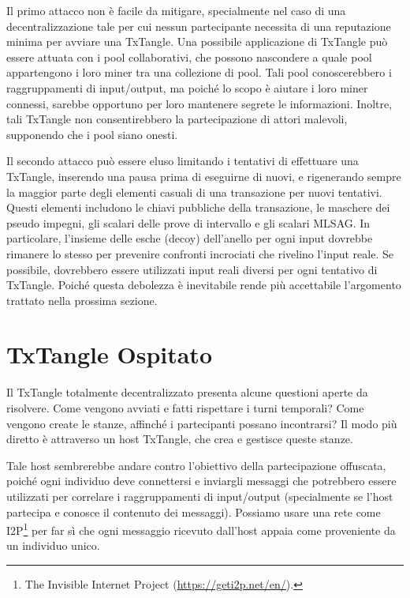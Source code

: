 Il primo attacco non è facile da mitigare, specialmente nel caso di una decentralizzazione tale per cui nessun partecipante necessita di una reputazione minima per avviare una TxTangle. Una possibile applicazione di TxTangle può essere attuata con i pool collaborativi, che possono nascondere a quale pool appartengono i loro miner tra una collezione di pool. Tali pool conoscerebbero i raggruppamenti di input/output, ma poiché lo scopo è aiutare i loro miner connessi, sarebbe opportuno per loro mantenere segrete le informazioni. Inoltre, tali TxTangle non consentirebbero la partecipazione di attori malevoli, supponendo che i pool siano onesti.

Il secondo attacco può essere eluso limitando i tentativi di effettuare una TxTangle, inserendo una pausa prima di eseguirne di nuovi, e rigenerando sempre la maggior parte degli elementi casuali di una transazione per nuovi tentativi. Questi elementi includono le chiavi pubbliche della transazione, le maschere dei pseudo impegni, gli scalari delle prove di intervallo e gli scalari MLSAG. In particolare, l'insieme delle esche (decoy) dell'anello per ogni input dovrebbe rimanere lo stesso per prevenire confronti incrociati che rivelino l'input reale. Se possibile, dovrebbero essere utilizzati input reali diversi per ogni tentativo di TxTangle. Poiché questa debolezza è inevitabile rende più accettabile l'argomento trattato nella prossima sezione.



\section{TxTangle Ospitato}
\label{sec:hosted-txtangle}

Il TxTangle totalmente decentralizzato presenta alcune questioni aperte da risolvere. Come vengono avviati e fatti rispettare i turni temporali? Come vengono create le stanze, affinché i partecipanti possano incontrarsi? Il modo più diretto è attraverso un host TxTangle, che crea e gestisce queste stanze. 

Tale host sembrerebbe andare contro l'obiettivo della partecipazione offuscata, poiché ogni individuo deve connettersi e inviargli messaggi che potrebbero essere utilizzati per correlare i raggruppamenti di input/output (specialmente se l'host partecipa e conosce il contenuto dei messaggi). Possiamo usare una rete come I2P\footnote{The Invisible Internet Project (\url{https://geti2p.net/en/}).} per far sì che ogni messaggio ricevuto dall'host appaia come proveniente da un individuo unico.


